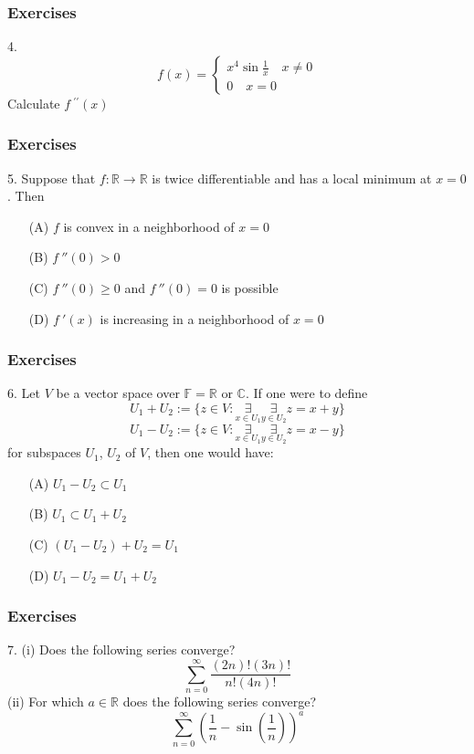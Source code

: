 \documentclass{beamer}
\newcommand{\R}{\mathbb{R}}
\begin{document}
\begin{frame}
    \frametitle{Exercises}
    \hspace{1em}
    4.
    $$ f(x)=\left\{
        \begin{aligned}
            x^4\sin \frac{1}{x} \quad x\neq 0 \\
            0  \quad x=0
        \end{aligned}
        \right.
    $$
    Calculate $f~^{\prime\prime}(x)$
\end{frame}


\begin{frame}
    \frametitle{Exercises}
    \hspace{1em}
    5. Suppose that $f: \R \to \R$ is twice differentiable and
    has a local minimum at $x=0$. Then
    \vspace{1em}
    \begin{itemize}
        \item[(A)] $f$ is convex in a neighborhood of $x=0$
        \item[(B)] $f~''(0)>0$
        \item[(C)] $f~''(0) \geq 0$ and $f~''(0)=0$ is possible
        \item[(D)] $f~'(x)$  is increasing in a neighborhood of $x=0$
    \end{itemize}
\end{frame}
\begin{frame}
    \frametitle{Exercises}
    \hspace{1em}
    6. Let $V$ be a vector space over $\mathbb{F}=\R \text{ or } \mathbb{C}$.
    If one were to define
    $$U_1+U_2:= \{ z\in V : \underset{x\in U_1}{\exists} \underset{y \in U_2}{\exists} z=x+y \}$$
    $$U_1-U_2:= \{ z\in V : \underset{x\in U_1}{\exists} \underset{y \in U_2}{\exists} z=x-y \}$$
    for subspaces $U_1$, $U_2$ of $V$, then one would have:
    \vspace{1em}
    \begin{itemize}
        \item[(A)] $U_1-U_2 \subset U_1$
        \item[(B)] $U_1\subset U_1+U_2$
        \item[(C)] $(U_1-U_2)+U_2=U_1$
        \item[(D)] $U_1-U_2=U_1+U_2$
    \end{itemize}
\end{frame}
\begin{frame}
    \frametitle{Exercises}
    \hspace{1em}
    7. (i) Does the following series converge?
    $$\sum_{n=0}^\infty \frac{(2n)!(3n)!}{n!(4n)!}$$
    \hspace{2em}
    (ii) For which $a \in \R$ does the following series converge?
    $$\sum_{n=0}^\infty (\frac{1}{n}-\sin(\frac{1}{n}))^a$$
\end{frame}
\end{document}
